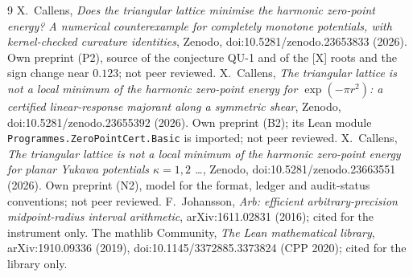 \documentclass[10pt]{article}
\newcommand{\tier}[1]{\textsf{[#1]}}
\newcommand{\tX}{\tier{X}}
\renewcommand{\_}{\textunderscore\penalty0\hspace{0pt}}
\begin{document}
\begin{thebibliography}{9}\small
{} X.~Callens, \emph{Does the triangular lattice minimise the harmonic zero-point energy? A numerical counterexample for completely monotone potentials, with kernel-checked curvature identities}, Zenodo, doi:10.5281/zenodo.23653833 (2026). Own preprint (P2), source of the conjecture QU-1 and of the \tX{} roots and the sign change near $0.123$; not peer reviewed.
 X.~Callens, \emph{The triangular lattice is not a local minimum of the harmonic zero-point energy for $\exp(-\pi r^2)$: a certified linear-response majorant along a symmetric shear}, Zenodo, doi:10.5281/zenodo.23655392 (2026). Own preprint (B2); its Lean module \texttt{Programmes.ZeroPointCert.Basic} is imported; not peer reviewed.
 X.~Callens, \emph{The triangular lattice is not a local minimum of the harmonic zero-point energy for planar Yukawa potentials $\kappa=1,2$ \ldots}, Zenodo, doi:10.5281/zenodo.23663551 (2026). Own preprint (N2), model for the format, ledger and audit-status conventions; not peer reviewed.
 F.~Johansson, \emph{Arb: efficient arbitrary-precision midpoint-radius interval arithmetic}, arXiv:1611.02831 (2016); cited for the instrument only.
 The mathlib Community, \emph{The Lean mathematical library}, arXiv:1910.09336 (2019), doi:10.1145/3372885.3373824 (CPP 2020); cited for the library only.
\end{thebibliography}
\end{document}
